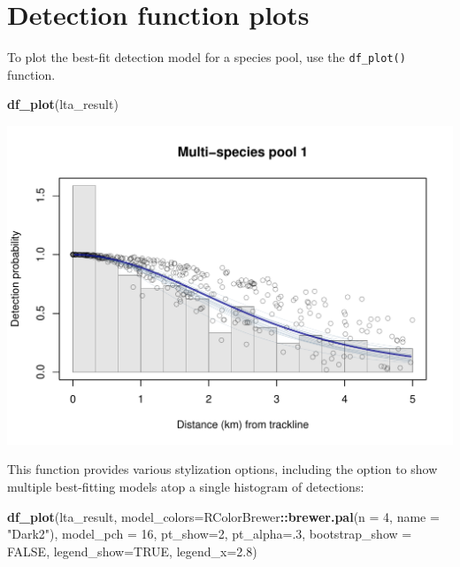\documentclass[
]{book}
\newenvironment{Shaded}{\begin{snugshade}}{\end{snugshade}}
\newcommand{\AttributeTok}[1]{\textcolor[rgb]{0.13,0.29,0.53}{#1}}
\newcommand{\ConstantTok}[1]{\textcolor[rgb]{0.56,0.35,0.01}{#1}}
\newcommand{\DecValTok}[1]{\textcolor[rgb]{0.00,0.00,0.81}{#1}}
\newcommand{\FloatTok}[1]{\textcolor[rgb]{0.00,0.00,0.81}{#1}}
\newcommand{\FunctionTok}[1]{\textcolor[rgb]{0.13,0.29,0.53}{\textbf{#1}}}
\newcommand{\NormalTok}[1]{#1}
\newcommand{\SpecialCharTok}[1]{\textcolor[rgb]{0.81,0.36,0.00}{\textbf{#1}}}
\newcommand{\StringTok}[1]{\textcolor[rgb]{0.31,0.60,0.02}{#1}}
\begin{document}
\hypertarget{detection-function-plots}{%
\section*{Detection function plots}\label{detection-function-plots}}

To plot the best-fit detection model for a species pool, use the \texttt{df\_plot()} function.

\begin{Shaded}
\begin{Highlighting}[]
\FunctionTok{df\_plot}\NormalTok{(lta\_result)}
\end{Highlighting}
\end{Shaded}

\includegraphics{figures/unnamed-chunk-324-1.pdf}

This function provides various stylization options, including the option to show multiple best-fitting models atop a single histogram of detections:

\begin{Shaded}
\begin{Highlighting}[]
\FunctionTok{df\_plot}\NormalTok{(lta\_result,}
        \AttributeTok{model\_colors=}\NormalTok{RColorBrewer}\SpecialCharTok{::}\FunctionTok{brewer.pal}\NormalTok{(}\AttributeTok{n =} \DecValTok{4}\NormalTok{, }\AttributeTok{name =} \StringTok{"Dark2"}\NormalTok{),}
        \AttributeTok{model\_pch =} \DecValTok{16}\NormalTok{,}
        \AttributeTok{pt\_show=}\DecValTok{2}\NormalTok{,}
        \AttributeTok{pt\_alpha=}\NormalTok{.}\DecValTok{3}\NormalTok{,}
        \AttributeTok{bootstrap\_show =} \ConstantTok{FALSE}\NormalTok{,}
        \AttributeTok{legend\_show=}\ConstantTok{TRUE}\NormalTok{,}
        \AttributeTok{legend\_x=}\FloatTok{2.8}\NormalTok{)}
\end{Highlighting}
\end{Shaded}
\end{document}
